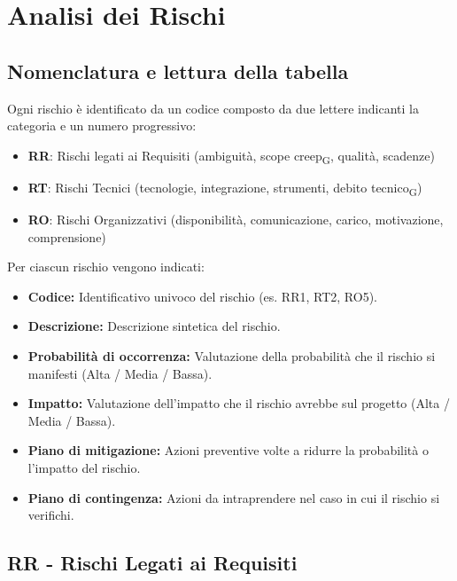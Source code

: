 \section{Analisi dei Rischi}
\subsection{Nomenclatura e lettura della tabella}
Ogni rischio è identificato da un codice composto da due lettere indicanti la categoria e un numero progressivo:
\begin{itemize}
	\item \textbf{RR}: Rischi legati ai Requisiti (ambiguità, scope creep\textsubscript{G}, qualità, scadenze)
	\item \textbf{RT}: Rischi Tecnici (tecnologie, integrazione, strumenti, debito tecnico\textsubscript{G})
	\item \textbf{RO}: Rischi Organizzativi (disponibilità, comunicazione, carico, motivazione, comprensione)
\end{itemize}

Per ciascun rischio vengono indicati:
\begin{itemize}
    \item \textbf{Codice:}  Identificativo univoco del rischio (es. RR1, RT2, RO5).
    \item \textbf{Descrizione:}  Descrizione sintetica del rischio.
    \item \textbf{Probabilità di occorrenza:}  Valutazione della probabilità che il rischio si manifesti (Alta / Media / Bassa).
    \item \textbf{Impatto:}  Valutazione dell'impatto che il rischio avrebbe sul progetto (Alta / Media / Bassa).
	\item \textbf{Piano di mitigazione:} Azioni preventive volte a ridurre la probabilità o l'impatto del rischio.
	\item \textbf{Piano di contingenza:} Azioni da intraprendere nel caso in cui il rischio si verifichi.
\end{itemize}

\subsection{RR - Rischi Legati ai Requisiti}

